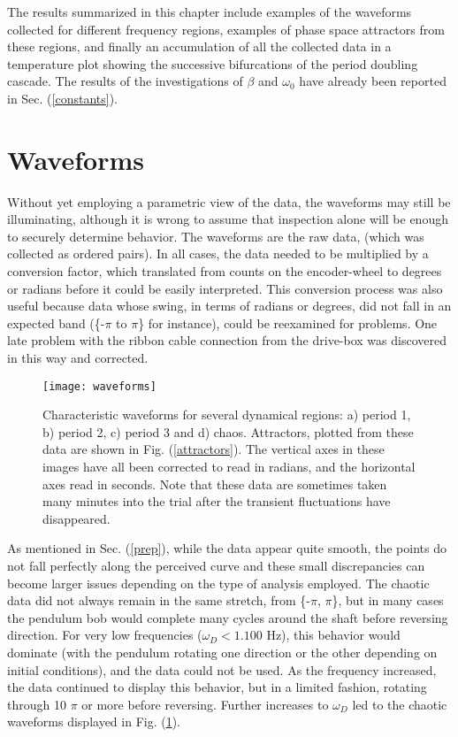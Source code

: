 \documentclass[12pt,twoside]{reedthesis}
\begin{document}
The results summarized in this chapter include examples of the waveforms collected for different frequency regions, examples of phase space attractors from these regions, and finally an accumulation of all the collected data in a temperature plot showing the successive bifurcations of the period doubling cascade.  The results of the investigations of $\beta$ and $\omega_0$ have already been reported in Sec. (\ref{constants}).  

\section{Waveforms}

Without yet employing a parametric view of the data, the waveforms may still be illuminating, although it is wrong to assume that inspection alone will be enough to securely determine behavior.  The waveforms are the raw data, (which was collected as ordered pairs).  In all cases, the data needed to be multiplied by a conversion factor, which translated from counts on the encoder-wheel to degrees or radians before it could be easily interpreted.  This conversion process was also useful because data whose swing, in terms of radians or degrees, did not fall in an expected band (\{-$\pi$ to $\pi$\} for instance), could be reexamined for problems.  One late problem with the ribbon cable connection from the drive-box was discovered in this way and corrected.  

	\begin{figure}[h]
\centering
\texttt{[image: waveforms]} 
\caption{Characteristic waveforms for several dynamical regions: a) period 1, b) period 2, c) period 3 and d) chaos.  Attractors, plotted from these data are shown in Fig. (\ref{attractors}).  The vertical axes in these images have all been corrected to read in radians, and the horizontal axes read in seconds.  Note that these data are sometimes taken many minutes into the trial after the transient fluctuations have disappeared.}
\label{waveforms}
\end{figure}



As mentioned in Sec. (\ref{prep}), while the data appear quite smooth, the points do not fall perfectly along the perceived curve and these small discrepancies can become larger issues depending on the type of analysis employed.  The chaotic data did not always remain in the same stretch, from \{-$\pi$, $\pi$\}, but in many cases the pendulum bob would complete many cycles around the shaft before reversing direction.  For very low frequencies ($\omega_D < 1.100$ Hz), this behavior would dominate (with the pendulum rotating one direction or the other depending on initial conditions), and the data could not be used.  As the frequency increased, the data continued to display this behavior, but in a limited fashion, rotating through 10 $\pi$ or more before reversing.  Further increases to $\omega_D$ led to the chaotic waveforms displayed in Fig. (\ref{waveforms}).  
\end{document}
